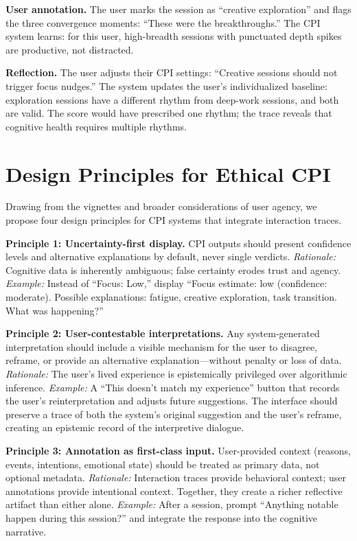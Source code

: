 \documentclass[10pt]{article}
\begin{document}
\textbf{User annotation.} The user marks the session as ``creative exploration'' and flags the three convergence moments: ``These were the breakthroughs.'' The CPI system learns: for this user, high-breadth sessions with punctuated depth spikes are productive, not distracted.

\textbf{Reflection.} The user adjusts their CPI settings: ``Creative sessions should not trigger focus nudges.'' The system updates the user's individualized baseline: exploration sessions have a different rhythm from deep-work sessions, and both are valid. The score would have prescribed one rhythm; the trace reveals that cognitive health requires multiple rhythms.

\section{Design Principles for Ethical CPI}

Drawing from the vignettes and broader considerations of user agency, we propose four design principles for CPI systems that integrate interaction traces.

\textbf{Principle 1: Uncertainty-first display.} CPI outputs should present confidence levels and alternative explanations by default, never single verdicts. \textit{Rationale:} Cognitive data is inherently ambiguous; false certainty erodes trust and agency. \textit{Example:} Instead of ``Focus: Low,'' display ``Focus estimate: low (confidence: moderate). Possible explanations: fatigue, creative exploration, task transition. What was happening?''

\textbf{Principle 2: User-contestable interpretations.} Any system-generated interpretation should include a visible mechanism for the user to disagree, reframe, or provide an alternative explanation---without penalty or loss of data. \textit{Rationale:} The user's lived experience is epistemically privileged over algorithmic inference. \textit{Example:} A ``This doesn't match my experience'' button that records the user's reinterpretation and adjusts future suggestions. The interface should preserve a trace of both the system's original suggestion and the user's reframe, creating an epistemic record of the interpretive dialogue.

\textbf{Principle 3: Annotation as first-class input.} User-provided context (reasons, events, intentions, emotional state) should be treated as primary data, not optional metadata. \textit{Rationale:} Interaction traces provide behavioral context; user annotations provide intentional context. Together, they create a richer reflective artifact than either alone. \textit{Example:} After a session, prompt ``Anything notable happen during this session?'' and integrate the response into the cognitive narrative.
\end{document}
